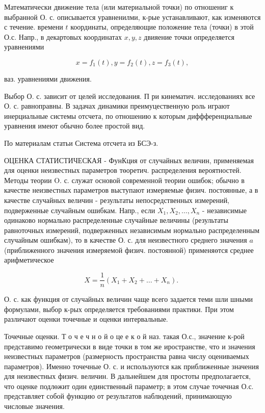 \documentclass[10pt]{article}
\begin{document}
Математически движение тела (или материальной точки) по отношениг к выбранной О. с. описывается уравненилми, к-рые устанавливают, как изменяются с течение. времени $t$ координаты, определяющие положение тела (точки) в этой О.с. Напр., в декартовых координатах $x, y, z$ двияение точки определяется уравнениями

\[
x=f_{1}(t), y=f_{2}(t), z=f_{3}(t),
\]

ваз. уравнениями движения.

Выбор О. с. зависит от целей исследования. П ри кинематич. исследованиях все О. с. равноправны. В задачах динамики преимуцественную роль играют инерциальные системы отсчета, по отношению к которым диффференциальные уравнения имеют обычно более простой вид.

По материалам статьи Система отсчета из БСЭ-з.

ОЦЕНКА СТАТИСТИЧЕСКАЯ - ФунКция от случайных величин, применяемая для оценки неизвестных параметров төоретич. распределения вероятностей. Методы теории $\mathrm{O}$. с. служат основой современной теории ошибок; обычно в качестве неизвестных параметров выступают измеряемые физич. постоянные, а в качестве случайных величин - результаты непосредственных измерений, подверженные случайным ошибкам. Напр., если $X_{1}, X_{2}, \ldots, X_{n}$ - независимые одинаково нормально распределенные случайные величины (результаты равноточных измерений, подверженных независимым нормально распределенным случайным ошибкам), то в качестве О. с. для неизвестного среднего значения $a$ (приближенного значения измеряемой физич. постоянной) применяөтся среднее арифметическое

\[
X=\frac{1}{n}\left(X_{1}+X_{2}+\ldots+X_{n}\right) \text {. }
\]

О. с. как функция от случайных величин чаще всего задается теми шли шными формулами, выбор к-рых определяется требованиями практики. При этом различают оценки точечные и оценки интервальные.

Точечные оценки. Т о ч е ч н о й $о$ це е к о й наз. такая О.с., значение к-рой представимо геометрически в виде точки в том же иространстве, что и значения неизвестных параметров (размерность пространства равна числу оцениваемых параметров). Именно точечные О. с. и используются как приближенные значения для неизвестных физич. величин. В дальнейшем для простоты предполагается, что оценке подлөжит один единственный параметр; в этом случае точечная О.с. представляет собой функцию от результатов наблюдений, принимающую числовые значения.
\end{document}
